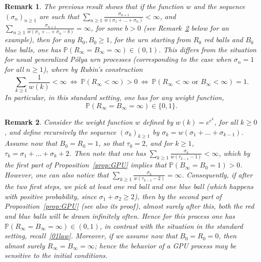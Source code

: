 \documentclass[11pt]{article}
\newtheorem {rem} {Remark} [section]
\newcommand{\1}{{\text{\Large $\mathfrak 1$}}}
\begin{document}
\begin{rem} 
\em{The previous result shows that if the function $w$ and the sequence $(\sigma_n)_{n\ge 1}$ are such that $\sum_{n\ge 1} \frac {\sigma_{n+1}}{w(\sigma_1+\dots+\sigma_n)} <\infty$, and $\sum_{n\ge 1} \frac {\sigma_{n+1}}{w(\sigma_1+\dots+\sigma_n-b)} =\infty$, for some $b>0$ (see Remark~\ref{rem:ex} below for an example), then for any $R_0,B_0\ge 1$, for the urn starting from $R_0$ red balls and $B_0$ blue balls, one has $\mathbb P(R_\infty = B_\infty = \infty) \in (0,1)$. 
This differs from the situation for usual generalized P\'olya urn processes (corresponding to the case when $\sigma_n = 1$ for all $n\ge 1$), where by Rubin's construction~\cite{Dav}  
\begin{equation}\label{Rubin}
\sum_{k\ge 1} \frac 1{w(k)} <\infty \ \Longleftrightarrow \ \mathbb P(R_\infty <\infty ) >0 \ \Longleftrightarrow \ \mathbb P( R_\infty <\infty \text{ or }B_\infty <\infty) = 1.
\end{equation}
In particular, in this standard setting, one has for any weight function, 
\begin{equation}\label{01law}
\mathbb P(R_\infty = B_\infty = \infty) \in \{0,1\}.
\end{equation}
}
\end{rem}

\begin{rem}\label{rem:ex}\em{
Consider the weight function $w$ defined by $w(k) = e^{e^k}$, for all $k\ge 0$, and define recursively the sequence $(\sigma_k)_{k\ge 1}$ by $\sigma_k = 
w(\sigma_1+\dots+\sigma_{k-1})$. Assume now that $B_0 = R_0 = 1$, so that $\tau_0=2$, and for $k\ge 1$, $\tau_k = \sigma_1+\dots+\sigma_k +  2$. Then note that one has $\sum_{k\ge 1} \frac{\sigma_k}{w(\tau_{k-1}-1)}<\infty$, which by the first part of Proposition~\ref{prop:GPU} implies that $\mathbb P(B_\infty = B_0 = 1) >0$. However, one can also notice that  $\sum_{k\ge 1} \frac{\sigma_k}{w(\tau_{k-1}-2)}=\infty$. Consequently, 
if after the two first steps, we pick at least one red ball and one blue ball (which happens with positive probability, since $\sigma_1 +\sigma_2\ge 2$), then by the second part of Proposition~\ref{prop:GPU} (see also its proof), almost surely after this, both the red and blue balls will be drawn infinitely often. Hence for this process one has $\mathbb P(R_\infty = B_\infty = \infty) \in (0,1)$, in contrast with the situation in the standard setting, recall~\eqref{01law}. Moreover, if we assume now that $B_0 = R_0=0$, then almost surely $R_\infty = B_\infty = \infty$; hence the behavior of a GPU process may be sensitive to the initial conditions. }
\end{rem}
\end{document}
